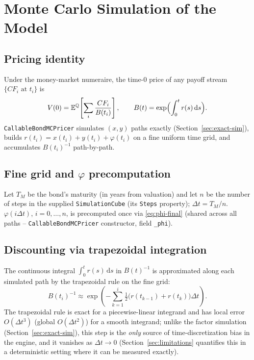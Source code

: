 \documentclass[11pt,a4paper]{article}
\newcommand{\dd}{\mathrm{d}}
\newcommand{\E}{\mathbb{E}}
\newcommand{\Q}{\mathbb{Q}}
\newcommand{\coderef}[1]{\texttt{\color{blue!60!black}#1}}
\theoremstyle{definition}
\begin{document}
\section{Monte Carlo Simulation of the Model}
\label{sec:mc}

\subsection{Pricing identity}

Under the money-market numeraire, the time-0 price of any payoff stream
$\{CF_i \text{ at } t_i\}$ is
\begin{equation}
  V(0) = \E^\Q\!\left[\sum_i \frac{CF_i}{B(t_i)}\right],
  \qquad B(t)=\exp\Bigl(\int_0^t r(s)\,\dd s\Bigr).
  \label{eq:mc-price}
\end{equation}
\coderef{CallableBondMCPricer} simulates $(x,y)$ paths exactly
(Section~\ref{sec:exact-sim}), builds $r(t_i)=x(t_i)+y(t_i)+\varphi(t_i)$
on a fine uniform time grid, and accumulates $B(t_i)^{-1}$ path-by-path.

\subsection{Fine grid and $\varphi$ precomputation}

Let $T_M$ be the bond's maturity (in years from valuation) and let $n$ be the
number of steps in the supplied \coderef{SimulationCube} (its \texttt{Steps}
property); $\Delta t = T_M/n$. $\varphi(i\Delta t)$, $i=0,\dots,n$, is
precomputed once via \eqref{eq:phi-final} (shared across all paths --
\coderef{CallableBondMCPricer} constructor, field \texttt{\_\allowbreak phi}).

\subsection{Discounting via trapezoidal integration}
\label{sec:mc-discount}

The continuous integral $\int_0^{t}r(s)\,\dd s$ in $B(t)^{-1}$ is approximated
along each simulated path by the trapezoidal rule on the fine grid:
\begin{equation}
  B(t_i)^{-1} \approx \exp\!\left(-\sum_{k=1}^{i}\tfrac12\bigl(r(t_{k-1})+r(t_k)\bigr)\Delta t\right).
  \label{eq:trapezoidal}
\end{equation}
The trapezoidal rule is exact for a piecewise-linear integrand and has local
error $O(\Delta t^3)$ (global $O(\Delta t^2)$) for a smooth integrand; unlike
the factor simulation (Section~\ref{sec:exact-sim}), this step is the
\emph{only} source of time-discretization bias in the engine, and it
vanishes as $\Delta t\to0$ (Section~\ref{sec:limitations} quantifies this
in a deterministic setting where it can be measured exactly).
\end{document}
